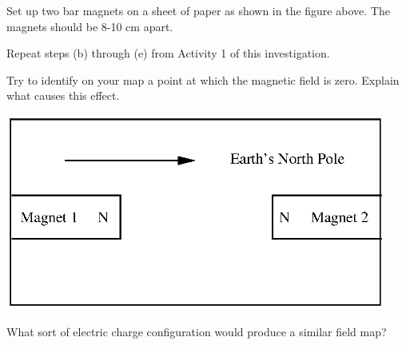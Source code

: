 \begin{enumerate}[labparts]
\begin{minipage}{0.5\textwidth}
\item Set up two bar magnets on a sheet of paper as shown in the figure
above. The magnets should be 8-10 cm apart.
\item Repeat steps (b) through (e) from Activity 1 of this investigation.
\item Try to identify on your map a point at which the magnetic field is
zero. Explain what causes this effect.
\vspace{5mm}
\end{minipage}
\begin{minipage}{0.49\textwidth}
\hspace{0.05\textwidth}\includegraphics[trim={0 0 3.5mm 0},clip,width=0.94\textwidth]{magnetism_field_perm_mag/magnetism_2_fig_3.eps}
\end{minipage}
\answerspace{30mm}


\item What sort of electric charge configuration would produce a similar
field map?\vspace{15mm}
\end{enumerate}

